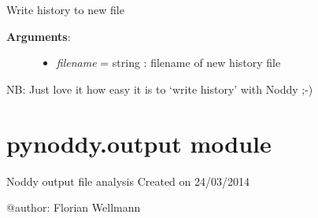 \documentclass[letterpaper,10pt,english]{sphinxmanual}
\begin{document}
\begin{fulllineitems}
\begin{fulllineitems}
\begin{description}
\begin{itemize}
\end{itemize}

\end{description}

\end{fulllineitems}


\begin{fulllineitems}
\label{pynoddy:pynoddy.history.NoddyHistory.write_history}
Write history to new file
\begin{description}
\item[{\textbf{Arguments}:}] \leavevmode\begin{itemize}
\item {} 
\emph{filename} = string : filename of new history file

\end{itemize}

\end{description}

NB: Just love it how easy it is to `write history' with Noddy ;-)

\end{fulllineitems}


\end{fulllineitems}



\section{pynoddy.output module}
\label{pynoddy:module-pynoddy.output}\label{pynoddy:pynoddy-output-module}
Noddy output file analysis
Created on 24/03/2014

@author: Florian Wellmann
\end{document}
